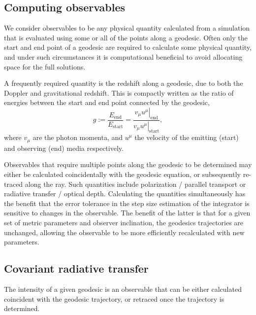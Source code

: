 \subsection{Computing observables}

We consider observables to be any physical quantity calculated from a simulation that is evaluated using some or all of the points along a geodesic. Often only the start and end point of a geodesic are required to calculate some physical quantity, and under such circumstances it is computational beneficial to avoid allocating space for the full solutions.

A frequently required quantity is the redshift along a geodesic, due to both the Doppler and gravitational redshift. This is compactly written as the ratio of energies between the start and end point connected by the geodesic,
\begin{equation}
\label{eq:redshift}
g := \frac{E_\text{end}}{E_\text{start}} = \frac{\left. v_\mu u^\mu \right\rvert_\text{end}}{\left. v_\mu u^\mu \right\rvert_{\text{start}}},
\end{equation}
where $v_\mu$ are the photon momenta, and $u^\mu$ the velocity of the emitting (start) and observing (end) media respectively.

Observables that require multiple points along the geodesic to be determined may either be calculated coincidentally with the geodesic equation, or subsequently re-traced along the ray. Such quantities include polarization / parallel transport or radiative transfer / optical depth. Calculating the quantities simultaneously has the benefit that the error tolerance in the step size estimation of the integrator is sensitive to changes in the observable. The benefit of the latter is that for a given set of metric parameters and observer inclination, the geodesics trajectories are unchanged, allowing the observable to be more efficiently recalculated with new parameters.

\subsection{Covariant radiative transfer}

The intensity of a given geodesic is an observable that can be either calculated coincident with the geodesic trajectory, or retraced once the trajectory is determined.

